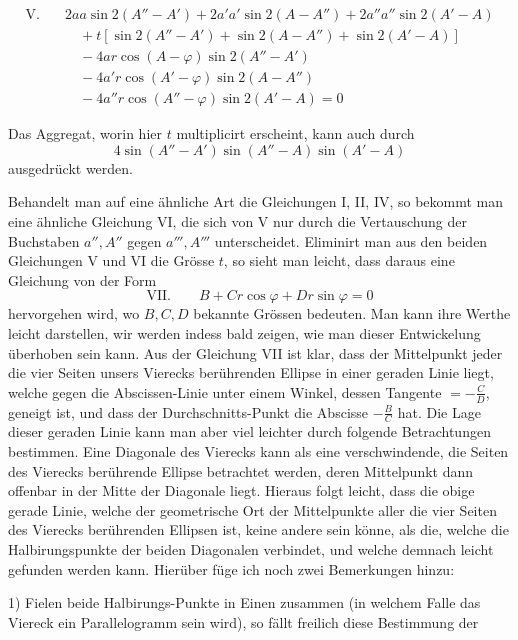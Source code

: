 %
\[
\begin{aligned}
\mathrm{V.}\quad&2aa\sin2(A''-A')+2a'a'\sin2(A-A'')+2a''a''\sin2(A'-A)\\
&\quad+t[\sin2(A''-A')+\sin2(A-A'')+\sin2(A'-A)]\\
&\quad-4ar\cos(A-\varphi)\sin2(A''-A')\\
&\quad-4a'r\cos(A'-\varphi)\sin2(A-A'')\\
&\quad-4a''r\cos(A''-\varphi)\sin2(A'-A)=0
\end{aligned}
\]
\par
Das Aggregat, worin hier \(t\) multiplicirt erscheint, kann auch durch
\[
4\sin(A''-A')\sin(A''-A)\sin(A'-A)
\]
ausgedrückt werden.

Behandelt man auf eine ähnliche Art die Gleichungen I, II, IV, so bekommt man eine ähnliche Gleichung VI, die sich von V nur durch die Vertauschung der Buchstaben \(a'',A''\) gegen \(a''',A'''\) unterscheidet. Eliminirt man aus den beiden Gleichungen V und VI die Grösse \(t\), so sieht man leicht, dass daraus eine Gleichung von der Form
\[
\mathrm{VII.}\qquad B+Cr\cos\varphi+Dr\sin\varphi=0
\]
hervorgehen wird, wo \(B,C,D\) bekannte Grössen bedeuten. Man kann ihre Werthe leicht darstellen, wir werden indess bald zeigen, wie man dieser Entwickelung überhoben sein kann. Aus der Gleichung VII ist klar, dass der Mittelpunkt jeder die vier Seiten unsers Vierecks berührenden Ellipse in einer geraden Linie liegt, welche gegen die Abscissen-Linie unter einem Winkel, dessen Tangente \(=-\frac{C}{D}\), geneigt ist, und dass der Durchschnitts-Punkt die Abscisse \(-\frac{B}{C}\) hat. Die Lage dieser geraden Linie kann man aber viel leichter durch folgende Betrachtungen bestimmen. Eine Diagonale des Vierecks kann als eine verschwindende, die Seiten des Vierecks berührende Ellipse betrachtet werden, deren Mittelpunkt dann offenbar in der Mitte der Diagonale liegt. Hieraus folgt leicht, dass die obige gerade Linie, welche der geometrische Ort der Mittelpunkte aller die vier Seiten des Vierecks berührenden Ellipsen ist, keine andere sein könne, als die, welche die Halbirungspunkte der beiden Diagonalen verbindet, und welche demnach leicht gefunden werden kann. Hierüber füge ich noch zwei Bemerkungen hinzu:

1) Fielen beide Halbirungs-Punkte in Einen zusammen (in welchem Falle das Viereck ein Parallelogramm sein wird), so fällt freilich diese Bestimmung der
